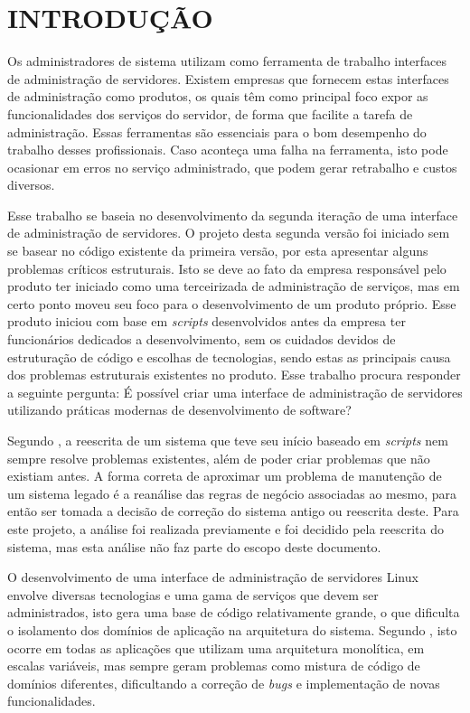 \chapter{INTRODUÇÃO}
\label{chp:intro}

Os administradores de sistema utilizam como ferramenta de trabalho interfaces
de administração de servidores. Existem empresas que fornecem estas interfaces
de administração como produtos, os quais têm como principal foco expor as
funcionalidades dos serviços do servidor, de forma que facilite a tarefa de
administração. Essas ferramentas são essenciais para o bom desempenho do
trabalho desses profissionais. Caso aconteça uma falha na ferramenta, isto
pode ocasionar em erros no serviço administrado, que podem gerar retrabalho
e custos diversos.

Esse trabalho se baseia no desenvolvimento da segunda iteração de uma
interface de administração de servidores. O projeto desta segunda versão
foi iniciado sem se basear no código existente da primeira versão, por esta
apresentar alguns problemas críticos estruturais. Isto se deve ao fato da
empresa responsável pelo produto ter iniciado como uma terceirizada de
administração de serviços, mas em certo ponto moveu seu foco para o
desenvolvimento de um produto próprio. Esse produto iniciou com base em
\emph{scripts} desenvolvidos antes da empresa ter funcionários dedicados a
desenvolvimento, sem os cuidados devidos de estruturação de código e escolhas
de tecnologias, sendo estas as principais causa dos problemas estruturais
existentes no produto. Esse trabalho procura responder a seguinte pergunta:
É possível criar uma interface de administração de servidores utilizando
práticas modernas de desenvolvimento de software?

Segundo , a reescrita de um sistema que teve seu
início baseado em \emph{scripts} nem sempre resolve problemas existentes,
além de poder criar problemas que não existiam antes. A forma correta de
aproximar um problema de manutenção de um sistema legado é a reanálise das
regras de negócio associadas ao mesmo, para então ser tomada a decisão de
correção do sistema antigo ou reescrita deste. Para este projeto, a análise
foi realizada previamente e foi decidido pela reescrita do sistema, mas esta
análise não faz parte do escopo deste documento.

O desenvolvimento de uma interface de administração de servidores Linux
envolve diversas tecnologias e uma gama de serviços que devem ser
administrados, isto gera uma base de código relativamente grande, o que
dificulta o isolamento dos domínios de aplicação na arquitetura
do sistema. Segundo , isto ocorre em todas as aplicações
que utilizam uma arquitetura monolítica, em escalas variáveis, mas sempre
geram problemas como mistura de código de domínios diferentes, dificultando
a correção de \emph{bugs} e implementação de novas funcionalidades.

